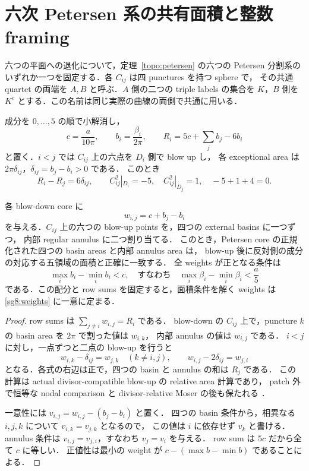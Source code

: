 \section{六次 Petersen 系の共有面積と整数 framing}
\label{sg8:section}

六つの平面への退化について，定理~\ref{topo:petersen} の六つの Petersen 分割系の
いずれか一つを固定する．各 $C_{ij}$ は四 punctures を持つ sphere で，
その共通 quartet の両端を $A,B$ と呼ぶ．$A$ 側の二つの triple labels の集合を
$K$，$B$ 側を $K^c$ とする．この名前は同じ実際の曲線の両側で共通に用いる．

成分を $0,\ldots,5$ の順で小解消し，
\[
 c=\frac{a}{10\pi},\qquad b_i=\frac{\beta_i}{2\pi},\qquad
 R_i=5c+\sum_jb_j-6b_i
\]
と置く．$i<j$ では $C_{ij}$ 上の六点を $D_i$ 側で blow up し，
各 exceptional area は $2\pi\delta_{ij}$，$\delta_{ij}=b_j-b_i>0$ である．
このとき
\[
 R_i-R_j=6\delta_{ij},\qquad
 C_{ij}^2|_{D_i}=-5,\quad C_{ij}^2|_{D_j}=1,
 \quad -5+1+4=0.
\]

\begin{proposition}
\label{sg8:areas}
各 blow-down core に
\begin{equation}\label{sg8:weights}
 w_{i,j}=c+b_j-b_i
\end{equation}
を与える．$C_{ij}$ 上の六つの blow-up points を，四つの external basins に一つずつ，
内部 regular annulus に二つ割り当てる．
このとき，Petersen core の正規化された四つの basin areas と内部 annulus area は，
blow-up 後に反対側の成分の対応する五領域の面積と正確に一致する．
全 weights が正となる条件は
\begin{equation}\label{sg8:positive}
 \max_i b_i-\min_i b_i<c,
 \quad\text{すなわち}\quad
 \max_i\beta_i-\min_i\beta_i<\frac a5
\end{equation}
である．この配分と row sums を固定すると，面積条件を解く weights は
\eqref{sg8:weights} に一意に定まる．
\end{proposition}

\begin{proof}
row sums は $\sum_{j\ne i}w_{i,j}=R_i$ である．
blow-down の $C_{ij}$ 上で，puncture $k$ の basin area を $2\pi$ で割った値は $w_{i,k}$，
内部 annulus の値は $w_{i,j}$ である．
$i<j$ に対し，一点ずつと二点の blow-up を行うと
\begin{equation}\label{sg8:matching-areas}
 w_{i,k}-\delta_{ij}=w_{j,k}\quad(k\ne i,j),\qquad
 w_{i,j}-2\delta_{ij}=w_{j,i}
\end{equation}
となる．各式の右辺は正で，四つの basin と annulus の和は $R_j$ である．
この計算は actual divisor-compatible blow-up の relative area 計算であり，
patch 外で恒等な nodal comparison と divisor-relative Moser の後も保たれる
\cite[Theorem 1.1]{CGblowup}．

一意性には $v_{i,j}=w_{i,j}-(b_j-b_i)$ と置く．
四つの basin 条件から，相異なる $i,j,k$ について $v_{i,k}=v_{j,k}$ となるので，
この値は $i$ に依存せず $v_k$ と書ける．
annulus 条件は $v_{i,j}=v_{j,i}$，すなわち $v_j=v_i$ を与える．
row sum は $5c$ だから全て $c$ に等しい．
正値性は最小の weight が $c-(\max b-\min b)$ であることによる．
\end{proof}

